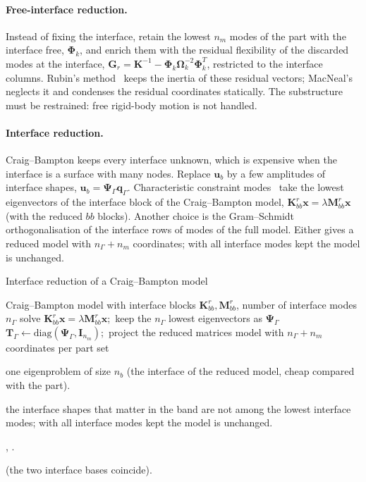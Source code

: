 \paragraph{Free-interface reduction.}
Instead of fixing the interface, retain the lowest $n_m$ modes of the part with the interface free, $\bm\Phi_k$, and enrich them with the residual flexibility of the discarded modes at the interface, $\bm G_r=\bm K^{-1}-\bm\Phi_k\bm\Omega_k^{-2}\bm\Phi_k^T$, restricted to the interface columns. Rubin's method~\cite{rubin1975} keeps the inertia of these residual vectors; MacNeal's~\cite{macneal1971} neglects it and condenses the residual coordinates statically. The substructure must be restrained: free rigid-body motion is not handled.

\paragraph{Interface reduction.}
Craig--Bampton keeps every interface unknown, which is expensive when the interface is a surface with many nodes. Replace $\bm u_b$ by a few amplitudes of interface shapes, $\bm u_b=\bm\Psi_\Gamma\bm q_\Gamma$. Characteristic constraint modes~\cite{castanier2001} take the lowest eigenvectors of the interface block of the Craig--Bampton model, $\bm K_{bb}^{r}\bm x=\lambda\bm M_{bb}^{r}\bm x$ (with the reduced $bb$ blocks). Another choice is the Gram--Schmidt orthogonalisation of the interface rows of modes of the full model. Either gives a reduced model with $n_\Gamma+n_m$ coordinates; with all interface modes kept the model is unchanged.

\begin{algbox}{Interface reduction of a Craig--Bampton model}
\begin{pseudo}
\Require Craig--Bampton model with interface blocks $\bm K^r_{bb},\bm M^r_{bb}$, number of interface modes $n_\Gamma$
\State solve $\bm K^r_{bb}\bm x=\lambda\bm M^r_{bb}\bm x$;\ keep the $n_\Gamma$ lowest eigenvectors as $\bm\Psi_\Gamma$ 
\State $\bm T_\Gamma\gets\mathrm{diag}(\bm\Psi_\Gamma,\bm I_{n_m})$;\ project the reduced matrices
\Ensure model with $n_\Gamma+n_m$ coordinates per part set
\end{pseudo}
\begin{algdet}
\item[Cost] one eigenproblem of size $n_b$ (the interface of the reduced model, cheap compared with the part).
\item[Fails when] the interface shapes that matter in the band are not among the lowest interface modes; with all interface modes kept the model is unchanged.
\item[Code] , .
\item[Verified in]  (the two interface bases coincide).
\end{algdet}
\end{algbox}


